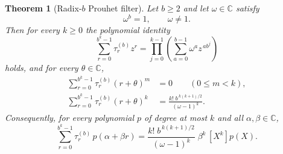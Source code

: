 \documentclass[11pt,oneside,openany]{book}
\newtheorem{theorem}{Theorem}[chapter]
\theoremstyle{definition}
\theoremstyle{remark}
\newcommand{\C}{\mathbb C}
\begin{document}
\begin{theorem}[Radix-$b$ Prouhet filter]\label{thm:radix-b-prouhet}
Let $b\ge2$ and let $\omega\in\C$ satisfy
\begin{equation}\label{eq:radix-b-omega}
 \omega^b=1,\qquad\omega\ne1 .
\end{equation}
Then for every $k\ge0$ the polynomial identity
\begin{equation}\label{eq:radix-b-product}
 \sum_{r=0}^{b^k-1}\tau^{(b)}_r z^r
 =\prod_{j=0}^{k-1}
   \left(\sum_{a=0}^{b-1}\omega^az^{\,ab^j}\right)
\end{equation}
holds, and for every $\theta\in\C$,
\begin{align}
 \sum_{r=0}^{b^k-1}\tau^{(b)}_r(r+\theta)^m&=0
 \qquad(0\le m<k),\label{eq:radix-b-lower}\\
 \sum_{r=0}^{b^k-1}\tau^{(b)}_r(r+\theta)^k
 &=\frac{k!\;b^{\,k(k+1)/2}}{(\omega-1)^k}.\label{eq:radix-b-top}
\end{align}
Consequently, for every polynomial $p$ of degree at most $k$ and all $\alpha,\beta\in\C$,
\begin{equation}\label{eq:radix-b-functional}
 \sum_{r=0}^{b^k-1}\tau^{(b)}_r\,p(\alpha+\beta r)
 =\frac{k!\;b^{\,k(k+1)/2}}{(\omega-1)^k}\;\beta^k\,[X^k]p(X).
\end{equation}
\end{theorem}
\end{document}
